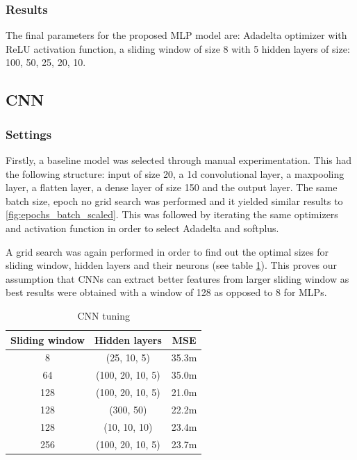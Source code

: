 \documentclass[12pt]{article}
\begin{document}
\subsubsection{Results}
The final parameters for the proposed MLP model are: Adadelta optimizer with ReLU activation function, a sliding window of size 8 with 5 hidden layers of size: 100, 50, 25, 20, 10.

\subsection{CNN}

\subsubsection{Settings}
Firstly, a baseline model was selected through manual experimentation. This had the following structure: input of size 20, a 1d convolutional layer, a maxpooling layer, a flatten layer, a dense layer of size 150 and the output layer. The same batch size, epoch no grid search was performed and it yielded similar results to \ref{fig:epochs_batch_scaled}. This was followed by iterating the same optimizers and activation function in 
order to select Adadelta and softplus.

A grid search was again performed in order to find out the optimal sizes for sliding window, hidden layers and their neurons (see table \ref{tab:cnn_tune}). This proves our assumption that CNNs can extract better features from larger sliding window as best results were obtained with a window of 128 as opposed to 8 for MLPs.

\begin{table}[htbp]
\caption{CNN tuning}
\begin{center}
\begin{tabular}{|c|c|c|}
\hline
Sliding window & Hidden layers & MSE \\
\hline
8 & (25, 10, 5) & 35.3m\\
\hline
64 & (100, 20, 10, 5) & 35.0m\\
\hline
128 & (100, 20, 10, 5) & 21.0m\\
\hline
128 & (300, 50) & 22.2m\\
\hline
128 & (10, 10, 10) & 23.4m\\
\hline
256 & (100, 20, 10, 5) & 23.7m\\
\hline
\end{tabular}
\label{tab:cnn_tune}
\end{center}
\end{table}
\end{document}
